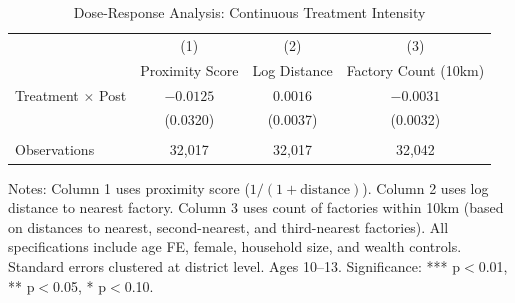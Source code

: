 \begin{table}[H]
\centering
\caption{Dose-Response Analysis: Continuous Treatment Intensity}
\label{tab:dose_response}
\begin{threeparttable}
\begin{tabular}{lccc}
\toprule
 & (1) & (2) & (3) \\
 & Proximity Score & Log Distance & Factory Count (10km) \\
\midrule
Treatment $\times$ Post & $-0.0125$ & $0.0016$ & $-0.0031$ \\
 & (0.0320) & (0.0037) & (0.0032) \\
\\
\midrule
Observations & 32,017 & 32,017 & 32,042 \\
\bottomrule
\end{tabular}
\begin{tablenotes}
\footnotesize
\item Notes: Column 1 uses proximity score ($1/(1+\text{distance})$). Column 2 uses log distance to nearest factory. Column 3 uses count of factories within 10km (based on distances to nearest, second-nearest, and third-nearest factories). All specifications include age FE, female, household size, and wealth controls. Standard errors clustered at district level. Ages 10--13. Significance: *** p$<$0.01, ** p$<$0.05, * p$<$0.10.
\end{tablenotes}
\end{threeparttable}
\end{table}